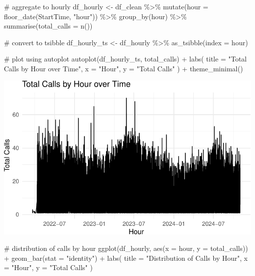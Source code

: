 \documentclass[
  letterpaper,
  DIV=11,
  numbers=noendperiod]{scrartcl}
\newenvironment{Shaded}{\begin{snugshade}}{\end{snugshade}}
\newcommand{\AttributeTok}[1]{\textcolor[rgb]{0.40,0.45,0.13}{#1}}
\newcommand{\CommentTok}[1]{\textcolor[rgb]{0.37,0.37,0.37}{#1}}
\newcommand{\FunctionTok}[1]{\textcolor[rgb]{0.28,0.35,0.67}{#1}}
\newcommand{\NormalTok}[1]{\textcolor[rgb]{0.00,0.23,0.31}{#1}}
\newcommand{\OtherTok}[1]{\textcolor[rgb]{0.00,0.23,0.31}{#1}}
\newcommand{\SpecialCharTok}[1]{\textcolor[rgb]{0.37,0.37,0.37}{#1}}
\newcommand{\StringTok}[1]{\textcolor[rgb]{0.13,0.47,0.30}{#1}}
\begin{document}
\begin{Shaded}
\begin{Highlighting}[]
\CommentTok{\# aggregate to hourly}
\NormalTok{df\_hourly }\OtherTok{\textless{}{-}}\NormalTok{ df\_clean }\SpecialCharTok{\%\textgreater{}\%}
  \FunctionTok{mutate}\NormalTok{(}\AttributeTok{hour =} \FunctionTok{floor\_date}\NormalTok{(StartTime, }\StringTok{"hour"}\NormalTok{)) }\SpecialCharTok{\%\textgreater{}\%}
  \FunctionTok{group\_by}\NormalTok{(hour) }\SpecialCharTok{\%\textgreater{}\%}
  \FunctionTok{summarise}\NormalTok{(}\AttributeTok{total\_calls =} \FunctionTok{n}\NormalTok{())}

\CommentTok{\# convert to tsibble}
\NormalTok{df\_hourly\_ts }\OtherTok{\textless{}{-}}\NormalTok{ df\_hourly }\SpecialCharTok{\%\textgreater{}\%}
  \FunctionTok{as\_tsibble}\NormalTok{(}\AttributeTok{index =}\NormalTok{ hour)}

\CommentTok{\# plot using autoplot}
\FunctionTok{autoplot}\NormalTok{(df\_hourly\_ts, total\_calls) }\SpecialCharTok{+}
  \FunctionTok{labs}\NormalTok{(}
    \AttributeTok{title =} \StringTok{"Total Calls by Hour over Time"}\NormalTok{, }
    \AttributeTok{x =} \StringTok{"Hour"}\NormalTok{,}
    \AttributeTok{y =} \StringTok{"Total Calls"}
\NormalTok{  ) }\SpecialCharTok{+}
  \FunctionTok{theme\_minimal}\NormalTok{()}
\end{Highlighting}
\end{Shaded}

\includegraphics{final_proj_group1_files/figure-pdf/hourly-1.pdf}

\begin{Shaded}
\begin{Highlighting}[]
\CommentTok{\# distribution of calls by hour}
\FunctionTok{ggplot}\NormalTok{(df\_hourly, }\FunctionTok{aes}\NormalTok{(}\AttributeTok{x =}\NormalTok{ hour, }\AttributeTok{y =}\NormalTok{ total\_calls)) }\SpecialCharTok{+} 
  \FunctionTok{geom\_bar}\NormalTok{(}\AttributeTok{stat =} \StringTok{"identity"}\NormalTok{) }\SpecialCharTok{+}
  \FunctionTok{labs}\NormalTok{(}
    \AttributeTok{title =} \StringTok{"Distribution of Calls by Hour"}\NormalTok{, }
    \AttributeTok{x =} \StringTok{"Hour"}\NormalTok{, }
    \AttributeTok{y =} \StringTok{"Total Calls"}
\NormalTok{  )}
\end{Highlighting}
\end{Shaded}
\end{document}
